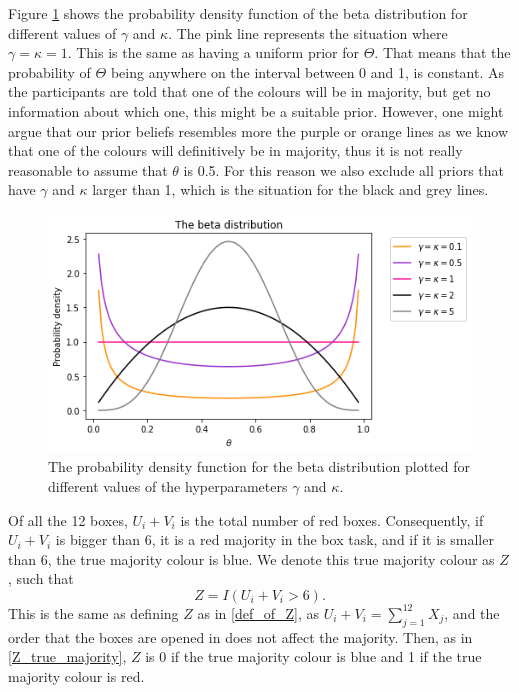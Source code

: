 Figure \ref{fig:pdf_beta_distr} shows the probability density function of the beta distribution for different values of $\gamma$ and $\kappa$. The pink line represents the situation where $\gamma=\kappa=1$. This is the same as having a uniform prior for $\Theta$. That means that the probability of $\Theta$ being anywhere on the interval between 0 and 1, is constant. As the participants are told that one of the colours will be in majority, but get no information about which one, this might be a suitable prior.
However, one might argue that our prior beliefs resembles more the purple or orange lines as we know that one of the colours will definitively be in majority, thus it is not really reasonable to assume that $\theta$ is 0.5. For this reason we also exclude all priors that have $\gamma$ and $\kappa$ larger than 1, which is the situation for the black and grey lines. 

\begin{figure}
    \centering
    \includegraphics[scale=0.5]{pictures/beta_pdf.png}
    \caption[Probability Density for the Beta Distribution]{The probability density function for the beta distribution plotted for different values of the hyperparameters $\gamma$ and $\kappa$.}
    \label{fig:pdf_beta_distr}
\end{figure}


Of all the 12 boxes, $U_i+V_i$ is the total number of red boxes.
Consequently, if $U_i+V_i$ is bigger than 6, it is a red majority in the box task, and if it is smaller than 6, the true majority colour is blue. We denote this true majority colour as $Z$, such that
\begin{equation}
\label{def_of_Z_2}
    Z = I(U_i+V_i>6).
\end{equation}
This is the same as defining $Z$ as in \eqref{def_of_Z}, as $U_i+V_i = \sum_{j=1}^{12}X_j$, and the order that the boxes are opened in does not affect the majority. Then, as in \eqref{Z_true_majority}, $Z$ is 0 if the true majority colour is blue and 1 if the true majority colour is red. 


